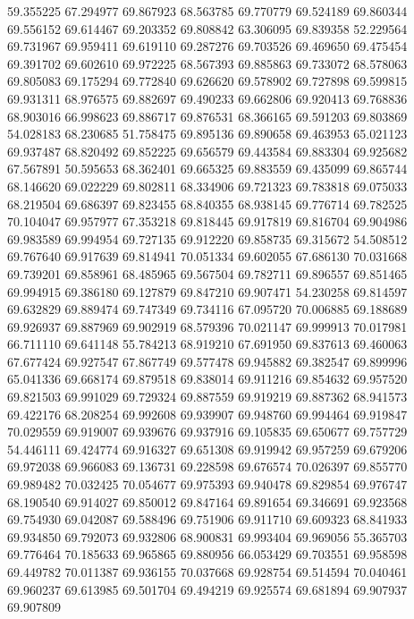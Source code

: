 59.355225
67.294977
69.867923
68.563785
69.770779
69.524189
69.860344
69.556152
69.614467
69.203352
69.808842
63.306095
69.839358
52.229564
69.731967
69.959411
69.619110
69.287276
69.703526
69.469650
69.475454
69.391702
69.602610
69.972225
68.567393
69.885863
69.733072
68.578063
69.805083
69.175294
69.772840
69.626620
69.578902
69.727898
69.599815
69.931311
68.976575
69.882697
69.490233
69.662806
69.920413
69.768836
68.903016
66.998623
69.886717
69.876531
68.366165
69.591203
69.803869
54.028183
68.230685
51.758475
69.895136
69.890658
69.463953
65.021123
69.937487
68.820492
69.852225
69.656579
69.443584
69.883304
69.925682
67.567891
50.595653
68.362401
69.665325
69.883559
69.435099
69.865744
68.146620
69.022229
69.802811
68.334906
69.721323
69.783818
69.075033
68.219504
69.686397
69.823455
68.840355
68.938145
69.776714
69.782525
70.104047
69.957977
67.353218
69.818445
69.917819
69.816704
69.904986
69.983589
69.994954
69.727135
69.912220
69.858735
69.315672
54.508512
69.767640
69.917639
69.814941
70.051334
69.602055
67.686130
70.031668
69.739201
69.858961
68.485965
69.567504
69.782711
69.896557
69.851465
69.994915
69.386180
69.127879
69.847210
69.907471
54.230258
69.814597
69.632829
69.889474
69.747349
69.734116
67.095720
70.006885
69.188689
69.926937
69.887969
69.902919
68.579396
70.021147
69.999913
70.017981
66.711110
69.641148
55.784213
68.919210
67.691950
69.837613
69.460063
67.677424
69.927547
67.867749
69.577478
69.945882
69.382547
69.899996
65.041336
69.668174
69.879518
69.838014
69.911216
69.854632
69.957520
69.821503
69.991029
69.729324
69.887559
69.919219
69.887362
68.941573
69.422176
68.208254
69.992608
69.939907
69.948760
69.994464
69.919847
70.029559
69.919007
69.939676
69.937916
69.105835
69.650677
69.757729
54.446111
69.424774
69.916327
69.651308
69.919942
69.957259
69.679206
69.972038
69.966083
69.136731
69.228598
69.676574
70.026397
69.855770
69.989482
70.032425
70.054677
69.975393
69.940478
69.829854
69.976747
68.190540
69.914027
69.850012
69.847164
69.891654
69.346691
69.923568
69.754930
69.042087
69.588496
69.751906
69.911710
69.609323
68.841933
69.934850
69.792073
69.932806
68.900831
69.993404
69.969056
55.365703
69.776464
70.185633
69.965865
69.880956
66.053429
69.703551
69.958598
69.449782
70.011387
69.936155
70.037668
69.928754
69.514594
70.040461
69.960237
69.613985
69.501704
69.494219
69.925574
69.681894
69.907937
69.907809
